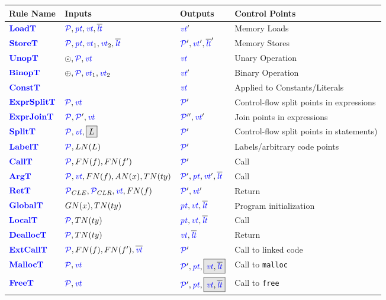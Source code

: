 \documentclass{llncs}
\begin{document}
\begin{table}[t]
  \begin{tabular}{|l|l|l|l|}
    \hline
    Rule Name & Inputs & Outputs & Control Points \\
    \hline
    \(\loadtname\)      & \(\loadtargs\)         & \(\loadtres\)      & Memory Loads \\
    \(\storetname\)     & \(\storetargs\)        & \(\storetres\)     & Memory Stores \\
    \(\unoptname\)      & \(\unoptargs\)         & \(\unoptres\)      & Unary Operation \\
    \(\binoptname\)     & \(\binoptargs\)        & \(\binoptres\)     & Binary Operation \\
    \(\consttname\)     &                        & \(\consttres\)     & Applied to Constants/Literals \\
    \(\exprsplittname\) & \(\exprsplittargs\)    & \(\exprsplittres\) & Control-flow split points in expressions \\
    \(\exprjointname\)  & \(\exprjointargs\)     & \(\exprjointres\)  & Join points in expressions \\
    \(\splittname\)     & \(\splittargs\)        & \(\splittres\)     & Control-flow split points in statements)\\
    \(\labeltname\)     & \(\labeltargs\)        & \(\labeltres\)     & Labels/arbitrary code points \\
    \(\calltname\)      & \(\calltargs\)         & \(\calltres\)      & Call \\
    \(\argtname\)       & \(\argtargs\)          & \(\argtres\)       & Call \\
    \(\rettname\)       & \(\rettargs\)          & \(\rettres\)       & Return \\
    \(\globaltname\)    & \(\globaltargs\)       & \(\globaltres\)    & Program initialization \\
    \(\localtname\)     & \(\localtargs\)        & \(\localtres\)     & Call \\
    \(\dealloctname\)   & \(\dealloctargs\)      & \(\dealloctres\)   & Return \\
    \(\extcalltname\)   & \(\extcalltargs\)      & \(\extcalltres\)   & Call to linked code \\
    \(\malloctname\)    & \(\malloctargs\)       & \(\malloctres\)    & Call to {\tt malloc} \\
    \(\freetname\)      & \(\freetargs\)         & \(\freetres\)      & Call to {\tt free} \\

\end{tabular}
\end{table}
\end{document}
